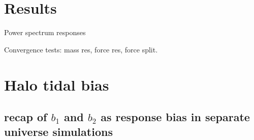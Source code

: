 \documentclass[a4paper,11pt]{article}
\begin{document}
\section{Results}
\label{sec:results}


Power spectrum responses


Convergence tests: mass res, force res, force split.

\section{Halo tidal bias}
\label{sec:bias}
\subsection{recap of $b_1$ and $b_2$ as response bias in separate universe simulations}
\end{document}
